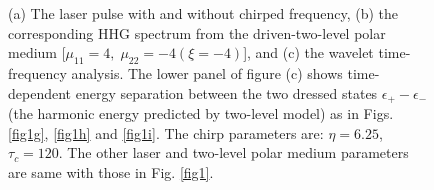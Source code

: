 \documentclass[10pt,letterpaper]{article}
\begin{document}
\begin{figure}[!htbp]
	\centering
	\caption{(a) The laser pulse with and without chirped frequency, (b) the corresponding HHG spectrum from the driven-two-level polar medium [$\mu_{11}=4,\;\mu_{22}=-4(\xi=-4)$], and (c) the wavelet time-frequency analysis. The lower panel of figure (c) shows time-dependent energy separation between the two dressed states $\epsilon_{+}-\epsilon_{-}$ (the harmonic energy predicted by two-level model) as in Figs. \ref{fig1g}, \ref{fig1h} and \ref{fig1i}. The chirp parameters are: $\eta=6.25$, $\tau_c=120$. The other laser and two-level polar medium parameters are same with those in Fig. \ref{fig1}.}
	\label{fig2}
\end{figure}
\end{document}
